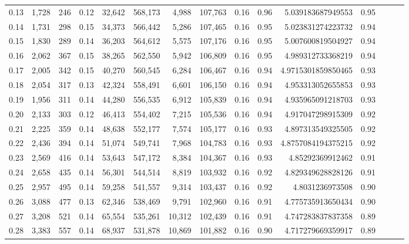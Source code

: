 \begin{tabular}{rrrrrrrrrrrrrrr}
0.13 &   1,728 &    246 &  0.12 &   32,642 &  568,173 &    4,988 &  107,763 &  0.16 &  0.96 &     5.039183687949553 &      0.95 \\
0.14 &   1,731 &    298 &  0.15 &   34,373 &  566,442 &    5,286 &  107,465 &  0.16 &  0.95 &     5.023831274223732 &      0.94 \\
0.15 &   1,830 &    289 &  0.14 &   36,203 &  564,612 &    5,575 &  107,176 &  0.16 &  0.95 &     5.007600819504927 &      0.94 \\
0.16 &   2,062 &    367 &  0.15 &   38,265 &  562,550 &    5,942 &  106,809 &  0.16 &  0.95 &     4.989312733368219 &      0.94 \\
0.17 &   2,005 &    342 &  0.15 &   40,270 &  560,545 &    6,284 &  106,467 &  0.16 &  0.94 &    4.9715301859850465 &      0.93 \\
0.18 &   2,054 &    317 &  0.13 &   42,324 &  558,491 &    6,601 &  106,150 &  0.16 &  0.94 &     4.953313052655853 &      0.93 \\
0.19 &   1,956 &    311 &  0.14 &   44,280 &  556,535 &    6,912 &  105,839 &  0.16 &  0.94 &     4.935965091218703 &      0.93 \\
0.20 &   2,133 &    303 &  0.12 &   46,413 &  554,402 &    7,215 &  105,536 &  0.16 &  0.94 &     4.917047298915309 &      0.92 \\
0.21 &   2,225 &    359 &  0.14 &   48,638 &  552,177 &    7,574 &  105,177 &  0.16 &  0.93 &     4.897313549325505 &      0.92 \\
0.22 &   2,436 &    394 &  0.14 &   51,074 &  549,741 &    7,968 &  104,783 &  0.16 &  0.93 &    4.8757084194375215 &      0.92 \\
0.23 &   2,569 &    416 &  0.14 &   53,643 &  547,172 &    8,384 &  104,367 &  0.16 &  0.93 &      4.85292369912462 &      0.91 \\
0.24 &   2,658 &    435 &  0.14 &   56,301 &  544,514 &    8,819 &  103,932 &  0.16 &  0.92 &     4.829349628828126 &      0.91 \\
0.25 &   2,957 &    495 &  0.14 &   59,258 &  541,557 &    9,314 &  103,437 &  0.16 &  0.92 &       4.8031236973508 &      0.90 \\
0.26 &   3,088 &    477 &  0.13 &   62,346 &  538,469 &    9,791 &  102,960 &  0.16 &  0.91 &     4.775735913650434 &      0.90 \\
0.27 &   3,208 &    521 &  0.14 &   65,554 &  535,261 &   10,312 &  102,439 &  0.16 &  0.91 &     4.747283837837358 &      0.89 \\
0.28 &   3,383 &    557 &  0.14 &   68,937 &  531,878 &   10,869 &  101,882 &  0.16 &  0.90 &     4.717279669359917 &      0.89 \\

\end{tabular}
